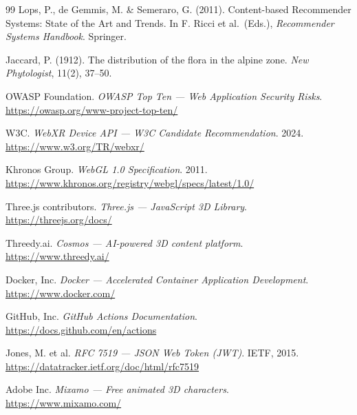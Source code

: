 \documentclass[12pt, a4paper, oneside]{report}
\begin{document}
\begin{thebibliography}{99}
Lops, P., de Gemmis, M. \& Semeraro, G. (2011). Content-based Recommender Systems: State of the Art and Trends.
In F. Ricci et al.\ (Eds.), \textit{Recommender Systems Handbook}. Springer.

Jaccard, P. (1912). The distribution of the flora in the alpine zone.
\textit{New Phytologist}, 11(2), 37--50.

OWASP Foundation. \textit{OWASP Top Ten --- Web Application Security Risks}.\\
\url{https://owasp.org/www-project-top-ten/} 

W3C. \textit{WebXR Device API --- W3C Candidate Recommendation}. 2024.\\
\url{https://www.w3.org/TR/webxr/} 

Khronos Group. \textit{WebGL 1.0 Specification}. 2011.\\
\url{https://www.khronos.org/registry/webgl/specs/latest/1.0/} 

Three.js contributors. \textit{Three.js --- JavaScript 3D Library}.\\
\url{https://threejs.org/docs/} 


Threedy.ai. \textit{Cosmos --- AI-powered 3D content platform}.\\
\url{https://www.threedy.ai/} 

Docker, Inc. \textit{Docker --- Accelerated Container Application Development}.\\
\url{https://www.docker.com/} 

GitHub, Inc. \textit{GitHub Actions Documentation}.\\
\url{https://docs.github.com/en/actions} 

Jones, M. et al. \textit{RFC 7519 --- JSON Web Token (JWT)}. IETF, 2015.\\
\url{https://datatracker.ietf.org/doc/html/rfc7519} 

Adobe Inc. \textit{Mixamo --- Free animated 3D characters}.\\
\url{https://www.mixamo.com/} 


\end{thebibliography}
\end{document}
